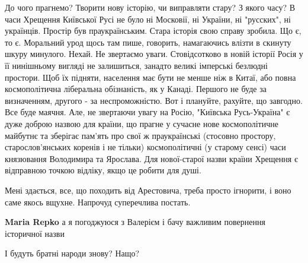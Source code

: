 \begin{itemize}
До чого прагнемо? Творити нову історію, чи виправляти стару? З якого часу? В
часи Хрещення Київської Русі не було ні Московії, ні України, ні "русских", ні
українців. Простір був праукраїнським. Стара історія свою справу зробила. Що є,
то є. Моральний урод щось там пише, говорить, намагаючись влізти в скинуту
шкуру минулого. Нехай. Не звертаємо уваги. Стовідсотково в новій історії Росія
у її нинішньому вигляді не залишиться, занадто великі імперські безлюдні
простори. Щоб їх підняти, населення має бути не менше ніж в Китаї, або повна
космополітична ліберальна обізнаність, як у Канаді. Першого не буде за
визначенням, другого - за неспроможністю. Вот і плануйте, рахуйте, що завгодно.
Все буде маячня. Але, не звертаючи увагу на Росію, "Київська Русь-Україна" є
дуже доброю назвою для країни, що прагне у сучасне нове космополітичне майбутнє
та зберігає пам'ять про свої ж праукраїнські (стосовно простору,
старослов'янських коренів і не тільки) космополітичні (у старому сенсі) часи
князювання Володимира та Ярослава. Для нової-старої назви країни Хрещення є
відправною точкою відліку, якщо це робити для душі.

 

Мені здається, все, що походить від Арестовича, треба просто ігнорити, і воно
саме якось вщухне. Напрочуд суперечлива постать.

\begin{itemize}
 

\textbf{Maria Repko} а я погоджуюся з Валерієм і бачу важливим повернення історичної назви

 
І будуть братні народи знову? Нащо?

 


\end{itemize}
\end{itemize}
